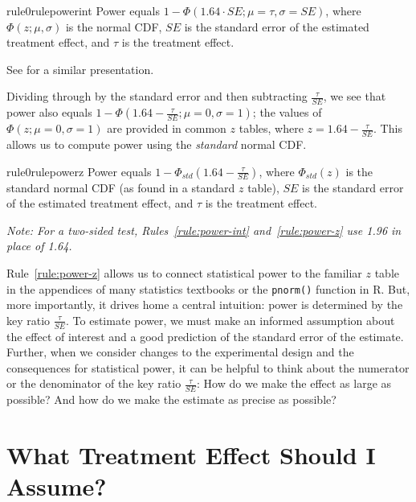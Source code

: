 \documentclass[12pt]{article}
\begin{document}
\begin{restatable}{rule0}{rulepowerint}
\label{rule:power-int}
Power equals $1 - \Phi(1.64 \cdot SE;\mu = \tau,\sigma = SE)$, where $\Phi(z;\mu,\sigma)$ is the normal CDF, $SE$ is the standard error of the estimated treatment effect, and $\tau$ is the treatment effect.
\end{restatable}

\noindent See \citet[93]{Gerber2012} for a similar presentation.

Dividing through by the standard error and then subtracting $\frac{\tau}{SE}$, we see that power also equals $1 - \Phi\left( 1.64 - \frac{\tau}{SE};\mu = 0,\sigma = 1 \right)$; the values of $\Phi\left(z;\mu = 0,\sigma = 1 \right)$ are provided in common $z$ tables, where $z = 1.64 - \frac{\tau}{SE}$.
This allows us to compute power using the \emph{standard} normal CDF.

\begin{restatable}{rule0}{rulepowerz}
\label{rule:power-z}
Power equals $1 - \Phi_{std}\left( 1.64 - \frac{\tau}{SE} \right)$, where $\Phi_{std}(z)$ is the standard normal CDF (as found in a standard $z$ table), $SE$ is the standard error of the estimated treatment effect, and $\tau$ is the treatment effect.
\end{restatable}

{\noindent \footnotesize\textit{Note: For a two-sided test, Rules~\ref{rule:power-int} and~\ref{rule:power-z} use 1.96 in place of 1.64.}}

\noindent Rule~\ref{rule:power-z} allows us to connect statistical power to the familiar $z$ table in the appendices of many statistics textbooks or the \texttt{pnorm()} function in R.
But, more importantly, it drives home a central intuition: power is determined by the key ratio $\frac{\tau}{SE}$.
To estimate power, we must make an informed assumption about the effect of interest and a good prediction of the standard error of the estimate.
Further, when we consider changes to the experimental design and the consequences for statistical power, it can be helpful to think about the numerator or the denominator of the key ratio $\frac{\tau}{SE}$: How do we make the effect as large as
possible? And how do we make the estimate as precise as possible?

\section*{What Treatment Effect Should I Assume?}
\end{document}
